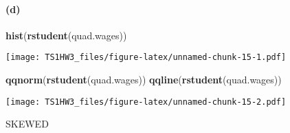 \documentclass[
]{article}
\newenvironment{Shaded}{\begin{snugshade}}{\end{snugshade}}
\newcommand{\FunctionTok}[1]{\textcolor[rgb]{0.13,0.29,0.53}{\textbf{#1}}}
\newcommand{\NormalTok}[1]{#1}
\begin{document}
\hypertarget{d}{%
\paragraph{(d)}\label{d}}

\begin{Shaded}
\begin{Highlighting}[]
\FunctionTok{hist}\NormalTok{(}\FunctionTok{rstudent}\NormalTok{(quad.wages))}
\end{Highlighting}
\end{Shaded}

\texttt{[image: TS1HW3\_files/figure-latex/unnamed-chunk-15-1.pdf]}

\begin{Shaded}
\begin{Highlighting}[]
\FunctionTok{qqnorm}\NormalTok{(}\FunctionTok{rstudent}\NormalTok{(quad.wages))}
\FunctionTok{qqline}\NormalTok{(}\FunctionTok{rstudent}\NormalTok{(quad.wages))}
\end{Highlighting}
\end{Shaded}

\texttt{[image: TS1HW3\_files/figure-latex/unnamed-chunk-15-2.pdf]}

SKEWED
\end{document}

